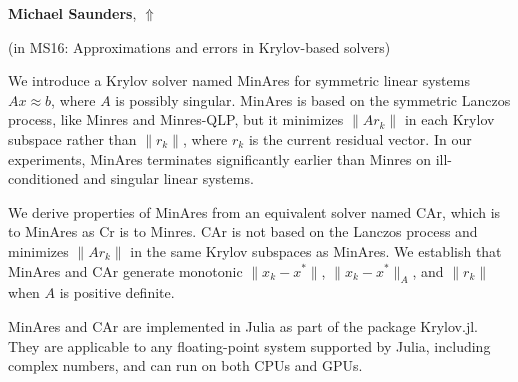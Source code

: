 \documentclass[ILAS2025-program.tex]{subfiles}
\begin{document}
\hypertarget{down0303}{}\begin{ilasabstract}
    
\textbf{Michael Saunders},  \hfill \hyperlink{up0303}{$\Uparrow$}
    
    
(in {\color{mstitle}MS16: Approximations and errors in Krylov-based solvers})
        
\mtskip
    We introduce a Krylov solver named MinAres for symmetric linear systems $Ax \approx b$, where $A$ is possibly singular.
MinAres is based on the symmetric Lanczos process, like Minres and Minres-QLP, but it minimizes $\|Ar_k\|$ in each Krylov subspace rather than $\|r_k\|$, where $r_k$ is the current residual vector.
In our experiments, MinAres terminates significantly earlier than Minres on ill-conditioned and singular linear systems.

We derive properties of MinAres from an equivalent solver named CAr, which is to MinAres as Cr is to Minres.
CAr is not based on the Lanczos process and minimizes $\|Ar_k\|$ in the same Krylov subspaces as MinAres.
We establish that MinAres and CAr generate monotonic $\|x_k - x^*\|$, $\|x_k - x^*\|_A$, and $\|r_k\|$ when $A$ is positive definite.

MinAres and CAr are implemented in Julia as part of the package Krylov.jl.
They are applicable to any floating-point system supported by Julia, including complex numbers, and can run on both CPUs and GPUs.
\end{ilasabstract}
    
\end{document}
